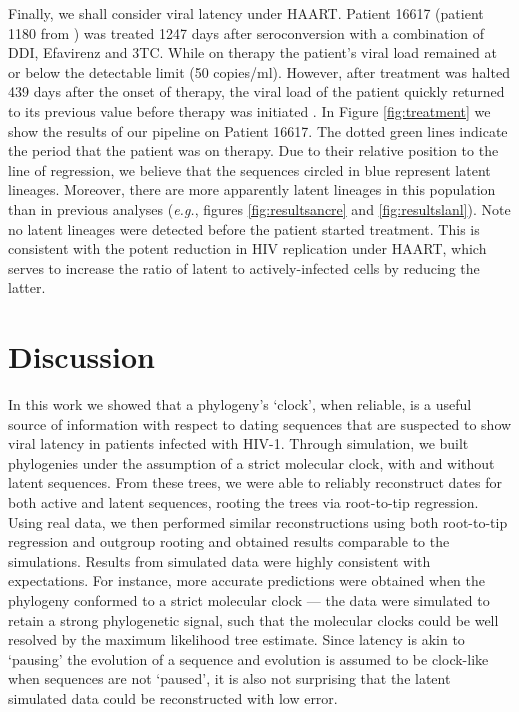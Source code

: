 \documentclass{bmcart}
\begin{document}

Finally, we shall consider viral latency under HAART.
Patient 16617 (patient 1180 from \cite{Llewellyn06}) was treated 1247 days after seroconversion with a combination of DDI, Efavirenz and 3TC.
While on therapy the patient's viral load remained at or below the detectable limit (50 copies/ml).
However, after treatment was halted 439 days after the onset of therapy, the viral load of the patient quickly returned to its previous value before therapy was initiated \cite{Llewellyn06}.
In Figure \ref{fig:treatment} we show the results of our pipeline on Patient 16617.
The dotted green lines indicate the period that the patient was on therapy.
Due to their relative position to the line of regression, we believe that the sequences circled in blue represent latent lineages.
Moreover, there are more apparently latent lineages in this population than in previous analyses (\textit{e.g.}, figures \ref{fig:resultsancre} and \ref{fig:resultslanl}).
Note no latent lineages were detected before the patient started treatment.
This is consistent with the potent reduction in HIV replication under HAART, which serves to increase the ratio of latent to actively-infected cells by reducing the latter.

\section * {Discussion} \label{sec:discuss}
In this work we showed that a phylogeny's `clock', when reliable, is a useful source of information with respect to dating sequences that are suspected to show viral latency in patients infected with HIV-1. 
Through simulation, we built phylogenies under the assumption of a strict molecular clock, with and without latent sequences.
From these trees, we were able to reliably reconstruct dates for both active and latent sequences, rooting the trees via root-to-tip regression.
Using real data, we then performed similar reconstructions using both root-to-tip regression and outgroup rooting and obtained results comparable to the simulations.
Results from simulated data were highly consistent with expectations. 
For instance, more accurate predictions were obtained when the phylogeny conformed to a strict molecular clock --- the data were simulated to retain a strong phylogenetic signal, such that the molecular clocks could be well resolved by the maximum likelihood tree estimate. 
Since latency is akin to `pausing' the evolution of a sequence and evolution is assumed to be clock-like when sequences are not `paused', it is also not surprising that the latent simulated data could be reconstructed with low error. 
\end{document}
